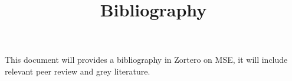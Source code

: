 \documentclass[a4paper,10pt]{article}
\title{Bibliography}
\author{}
\begin{document}
\maketitle

This document will provides a bibliography in Zortero on MSE, it will include relevant peer review and grey literature.

  
\end{document}
